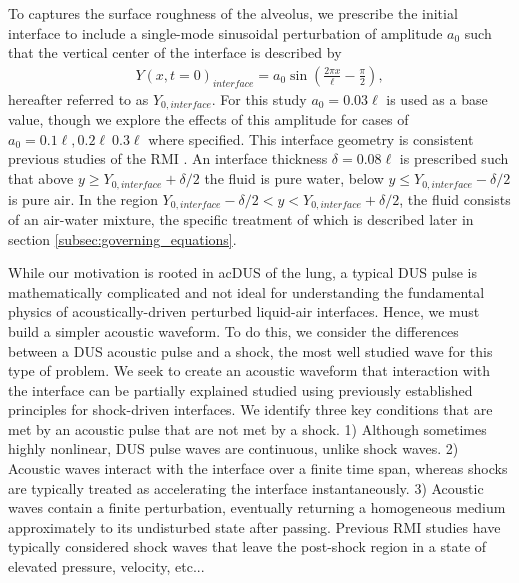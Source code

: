 To captures the surface roughness of the alveolus, we prescribe the
initial interface to include a single-mode sinusoidal perturbation of
amplitude $a_0$ such that the vertical center of the interface is
described by
\begin{align} %
  Y(x,t=0)_{interface} = a_0\sin\left(\frac{2\pi x}{\ell}-\frac{\pi}{2}\right),
\end{align}
hereafter referred to as $Y_{0,interface}$. For this study
$a_0=0.03\ell$ is used as a base value, though we explore the effects
of this amplitude for cases of $a_0=0.1\ell, 0.2\ell\ 0.3\ell$ where
specified. This interface geometry is consistent previous studies of
the \ac{RMI} \citep{Brouillette2002}. An interface thickness
$\delta=0.08\ell$ is prescribed such that above
$y\geq Y_{0,interface}+\delta/2$ the fluid is pure water, below
$y\leq Y_{0,interface}-\delta/2$ is pure air. In the region
$Y_{0,interface}-\delta/2 < y < Y_{0,interface}+\delta/2$, the fluid
consists of an air-water mixture, the specific treatment of which is
described later in section \ref{subsec:governing_equations}.

While our motivation is rooted in ac{DUS} of the lung, a typical
\ac{DUS} pulse is mathematically complicated and not ideal for
understanding the fundamental physics of acoustically-driven perturbed
liquid-air interfaces. Hence, we must build a simpler acoustic
waveform. To do this, we consider the differences between a \ac{DUS}
acoustic pulse and a shock, the most well studied wave for this type
of problem. We seek to create an acoustic waveform that interaction
with the interface can be partially explained studied using previously
established principles for shock-driven interfaces. We identify three
key conditions that are met by an acoustic pulse that are not met by a
shock. 1) Although sometimes highly nonlinear, \ac{DUS} pulse waves
are continuous, unlike shock waves. 2) Acoustic waves interact with
the interface over a finite time span, whereas shocks are typically
treated as accelerating the interface instantaneously. 3) Acoustic
waves contain a finite perturbation, eventually returning a
homogeneous medium approximately to its undisturbed state after
passing. Previous \ac{RMI} studies have typically considered shock
waves that leave the post-shock region in a state of elevated
pressure, velocity, etc... 

